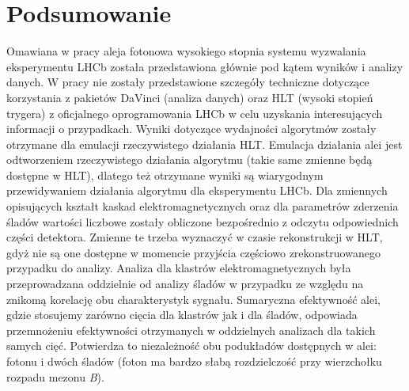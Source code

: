 \documentclass{pracamgr}
\begin{document}
\chapter{Podsumowanie}
Omawiana w pracy aleja fotonowa wysokiego stopnia systemu wyzwalania eksperymentu LHCb została przedstawiona głównie pod kątem wyników i analizy danych. W pracy nie zostały przedstawione szczegóły techniczne dotyczące korzystania z pakietów DaVinci (analiza danych) oraz HLT (wysoki stopień trygera) z oficjalnego oprogramowania LHCb w celu uzyskania interesujących informacji o przypadkach. Wyniki dotyczące wydajności algorytmów zostały otrzymane dla emulacji rzeczywistego działania HLT. Emulacja działania alei jest odtworzeniem rzeczywistego działania algorytmu (takie same zmienne będą dostępne w HLT), dlatego też otrzymane wyniki są wiarygodnym przewidywaniem działania algorytmu dla eksperymentu LHCb. Dla zmiennych opisujących kształt kaskad elektromagnetycznych oraz dla parametrów zderzenia śladów wartości liczbowe zostały obliczone bezpośrednio z odczytu odpowiednich części detektora. Zmienne te trzeba wyznaczyć w czasie rekonstrukcji w HLT, gdyż nie są one dostępne w momencie przyjścia częściowo zrekonstruowanego przypadku do analizy. Analiza dla klastrów elektromagnetycznych była przeprowadzana oddzielnie od analizy śladów w przypadku ze względu na znikomą korelację obu charakterystyk sygnału. Sumaryczna efektywność alei, gdzie stosujemy zarówno cięcia dla klastrów jak i dla śladów, odpowiada przemnożeniu efektywności otrzymanych w oddzielnych analizach dla takich samych cięć. Potwierdza to niezależność obu podukładów dostępnych w alei: fotonu i dwóch śladów (foton ma bardzo słabą rozdzielczość przy wierzchołku rozpadu mezonu \textit{B}).
\\\\
\noindent
\end{document}
